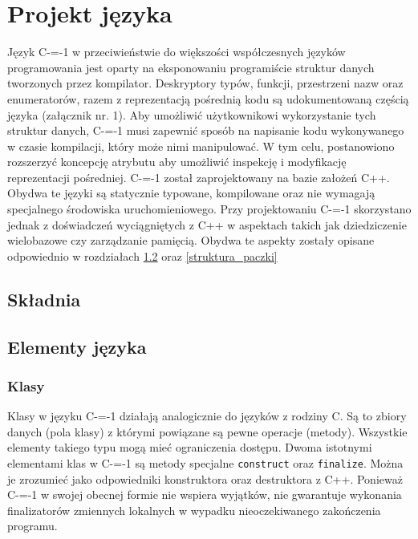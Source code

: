 \section{Projekt języka}
\label{Language_desig}
Język C-=-1 w przeciwieństwie do większości współczesnych języków programowania jest oparty na eksponowaniu programiście struktur danych tworzonych przez kompilator. Deskryptory typów, funkcji, przestrzeni nazw oraz enumeratorów, razem z reprezentacją pośrednią kodu są udokumentowaną częścią języka (załącznik nr. 1).
Aby umożliwić użytkownikowi wykorzystanie tych struktur danych, C-=-1 musi zapewnić sposób na napisanie kodu wykonywanego w czasie kompilacji, który może nimi manipulować. W tym celu, postanowiono rozszerzyć koncepcję atrybutu aby umożliwić inspekcję i modyfikację reprezentacji pośredniej.
C-=-1 został zaprojektowany na bazie założeń C++. Obydwa te języki są statycznie typowane, kompilowane oraz nie wymagają specjalnego środowiska uruchomieniowego. Przy projektowaniu C-=-1 skorzystano jednak z doświadczeń wyciągniętych z C++ w aspektach takich jak dziedziczenie wielobazowe czy zarządzanie pamięcią. Obydwa te aspekty zostały opisane odpowiednio w rozdziałach \ref{elementy_jezyka} oraz \ref{struktura_paczki}

\subsection{Składnia}

\subsection{Elementy języka}
\label{elementy_jezyka}

\subsubsection{Klasy}\label{klasy}
Klasy w języku C-=-1 działają analogicznie do języków z rodziny C.
Są to zbiory danych (pola klasy) z którymi powiązane są pewne operacje (metody).
Wszystkie elementy takiego typu mogą mieć ograniczenia dostępu.
Dwoma istotnymi elementami klas w C-=-1 są metody specjalne \lstinline{construct} oraz \lstinline{finalize}.
Można je zrozumieć jako odpowiedniki konstruktora oraz destruktora z C++.
Ponieważ C-=-1 w swojej obecnej formie nie wspiera wyjątków, nie gwarantuje wykonania finalizatorów zmiennych lokalnych w wypadku nieoczekiwanego zakończenia programu.
